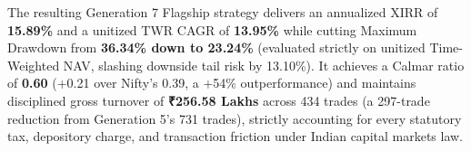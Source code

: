 \documentclass[11pt,a4paper]{article}
\begin{document}
The resulting Generation 7 Flagship strategy delivers an annualized XIRR of \textbf{15.89\%} and a unitized TWR CAGR of \textbf{13.95\%} while cutting Maximum Drawdown from \textbf{36.34\% down to 23.24\%} (evaluated strictly on unitized Time-Weighted NAV, slashing downside tail risk by 13.10\%). It achieves a Calmar ratio of \textbf{0.60} (+0.21 over Nifty's 0.39, a +54\% outperformance) and maintains disciplined gross turnover of \textbf{₹256.58 Lakhs} across 434 trades (a 297-trade reduction from Generation 5's 731 trades), strictly accounting for every statutory tax, depository charge, and transaction friction under Indian capital markets law.
\end{document}
